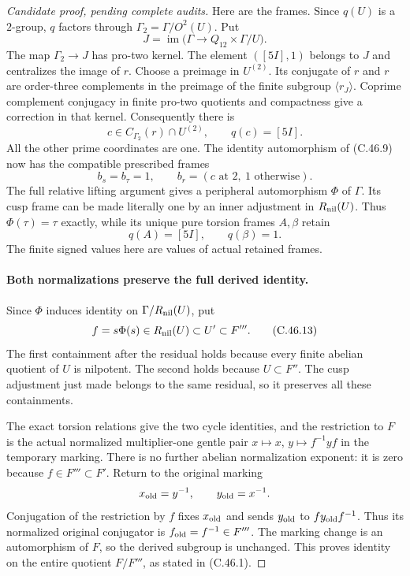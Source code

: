 \begin{proof}[Candidate proof, pending complete audits]
Here are the frames. Since $q(U)$ is a $2$-group, $q$ factors
through $\Gamma_2=\Gamma/O^2(U)$. Put
\[
 J=\operatorname{im}\bigl(\Gamma\to Q_{12}\times\Gamma/U\bigr).
\]
The map $\Gamma_2\to J$ has pro-two kernel. The element
$([5I],1)$ belongs to $J$ and centralizes the image of $r$.
Choose a preimage in $U^{(2)}$. Its conjugate of $r$ and $r$
are order-three complements in the preimage of the finite subgroup
$\langle r_J\rangle$. Coprime complement conjugacy in finite
pro-two quotients and compactness give a correction in that kernel.
Consequently there is
\[
 c\in C_{\Gamma_2}(r)\cap U^{(2)},\qquad q(c)=[5I].  \tag{C.46.10}
\]
All the other prime coordinates are one. The identity automorphism
of (C.46.9) now has the compatible prescribed frames
\[
 b_s=b_\tau=1,\qquad b_r=(c\text{ at }2,\ 1\text{ otherwise}).
                                                               \tag{C.46.11}
\]
The full relative lifting argument gives a peripheral automorphism
$\Phi$ of $\Gamma$. Its cusp frame can be made literally one by
an inner adjustment in $R_{\rm nil}(U)$. Thus $\Phi(\tau)=\tau$
exactly, while its unique pure torsion frames $A,\beta$ retain
\[
                    q(A)=[5I],\qquad q(\beta)=1.      \tag{C.46.12}
\]
The finite signed values here are values of actual retained frames.

\paragraph{Both normalizations preserve the full derived identity.}
Since $\Phi$ induces identity on $\Gamma/R_{\rm nil}(U)$, put
\[
 f=s\Phi(s)\in R_{\rm nil}(U)\subset U'\subset F''' . \tag{C.46.13}
\]
The first containment after the residual holds because every finite
abelian quotient of $U$ is nilpotent. The second holds because
$U\subset F''$. The cusp adjustment just made belongs to the same
residual, so it preserves all these containments.

The exact torsion relations give the two cycle identities, and the
restriction to $F$ is the actual normalized multiplier-one gentle
pair $x\mapsto x$, $y\mapsto f^{-1}yf$ in the temporary marking.
There is no further abelian normalization exponent: it is zero
because $f\in F'''\subset F'$. Return to the original marking
\[
             x_{\rm old}=y^{-1},\qquad y_{\rm old}=x^{-1}.
\]
Conjugation of the restriction by $f$ fixes $x_{\rm old}$ and
sends $y_{\rm old}$ to $f y_{\rm old}f^{-1}$. Thus its normalized
original conjugator is $f_{\rm old}=f^{-1}\in F'''$.
The marking change is an automorphism of $F$, so the derived
subgroup is unchanged. This proves identity on the entire quotient
$F/F'''$, as stated in (C.46.1).


\end{proof}
